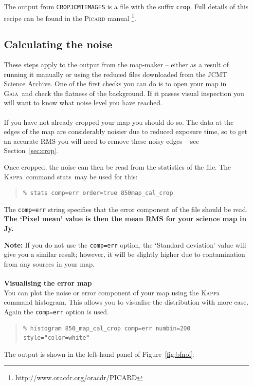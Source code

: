\documentclass[twoside,11pt]{article}
\newcommand{\htmladdnormallink}[2]{#1}
\newcommand{\htmlref}[2]{#1}
\newcommand{\latex}[1]{#1}
\newcommand{\latexhtml}[2]{#1}
\newcommand{\xref}[3]{#1}
\newcommand{\xlabel}[1]{}
\renewcommand{\_}{\texttt{\symbol{95}}}
\newenvironment{myquote}{\begin{quote}\begin{small}}{\end{small}\end{quote}}
\newcommand{\gaia}{\xref{\textsc{Gaia}}{sun214}{}}
\newcommand{\Kappa}{\xref{\textsc{Kappa}}{sun95}{}}
\newcommand{\drrecipe}[1]{\texttt{#1}}
\newcommand{\task}[1]{\textsf{#1}}
\newcommand{\param}[1]{\texttt{#1}}
\newcommand{\histogram}{\xref{\task{histogram}}{sun95}{HISTOGRAM}}
\newcommand{\stats}{\xref{\task{stats}}{sun95}{STATS}}
\newcommand{\cref}[3]{\latexhtml{#1~\ref{#2}}{\htmlref{#3}{#2}}}
\begin{document}
The output from \drrecipe{CROP\_JCMT\_IMAGES} is a file with the suffix
\texttt{\_crop}. Full details of this recipe can be found in the
\htmladdnormallink{\textsc{Picard} manual}{http://www.oracdr.org/oracdr/PICARD}
\latex{\footnote{http://www.oracdr.org/oracdr/PICARD}}.

\subsection{\xlabel{noise}Calculating the noise}

These steps apply to the output from the map-maker -- either as a
result of running it manually or using the reduced files downloaded
from the \htmladdnormallink{JCMT Science
Archive.}{http://www3.cadc-ccda.hia-iha.nrc-cnrc.gc.ca/jcmt/} One of
the first checks you can do is to open your map in \gaia\ and check
the flatness of the background. If it passes visual inspection you
will want to know what noise level you have reached.
\\ \\
If you have not already cropped your map you should do so. The data at
the edges of the map are considerably noisier due to reduced exposure
time, so to get an accurate RMS you will need to remove these noisy
edges -- see \cref{Section}{sec:crop}{Cropping your map}.

Once cropped, the noise can then be read from the statistics of the
file. The \Kappa\ command \stats\ may be used for this:
\begin{myquote}
\begin{verbatim}
% stats comp=err order=true 850map_cal_crop
\end{verbatim}
\end{myquote}
The \param{comp=err} string specifies that the error component of the
file should be read. \textbf{The `Pixel mean' value is then the mean
RMS for your science map in Jy.}

\textbf{Note:} If you do not use the \param{comp=err} option, the `Standard
deviation' value will give you a similar result; however, it will be
slightly higher due to contamination from any sources in your map.
\\ \\
\textbf{Visualising the error map}\\
You can plot the noise or error component of your map using the
\textsc{Kappa} command \histogram. This allows you to visualise the
distribution with more ease. Again the \param{comp=err} option is
used.
\begin{myquote}
\begin{verbatim}
% histogram 850_map_cal_crop comp=err numbin=200 style="color=white"
\end{verbatim}
\end{myquote}
The output is shown in the left-hand panel of \cref{Figure}{fig:bfnoi}{the
graphics below}.
\end{document}
